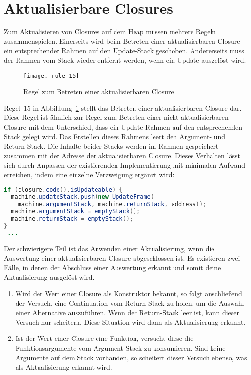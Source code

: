 \section{Aktualisierbare Closures}\label{sec:updateable-closures}

Zum Aktualisieren von Closures auf dem Heap müssen mehrere Regeln zusammenspielen.
Einerseits wird beim Betreten einer aktualisierbaren Closure ein entsprechender Rahmen auf den Update-Stack geschoben.
Andererseits muss der Rahmen vom Stack wieder entfernt werden, wenn ein Update ausgelöst wird.

\begin{figure}[h]
  \centering
  \texttt{[image: rule-15]}
  \caption{Regel zum Betreten einer aktualisierbaren Closure}\label{fig:rule-15}
\end{figure}

Regel~15 in Abbildung~\ref{fig:rule-15} stellt das Betreten einer aktualisierbaren Closure dar.
Diese Regel ist ähnlich zur Regel zum Betreten einer nicht-aktualisierbaren Closure mit dem Unterschied, dass ein Update-Rahmen auf den entsprechenden Stack gelegt wird.
Das Erstellen dieses Rahmens leert den Argument- und Return-Stack.
Die Inhalte beider Stacks werden im Rahmen gespeichert zusammen mit der Adresse der aktualisierbaren Closure.
Dieses Verhalten lässt sich durch Anpassen der existierenden Implementierung mit minimalen Aufwand erreichen, indem eine einzelne Verzweigung ergänzt wird:

\begin{lstlisting}[language=java]
if (closure.code().isUpdateable) {
  machine.updateStack.push(new UpdateFrame(
    machine.argumentStack, machine.returnStack, address));
  machine.argumentStack = emptyStack();
  machine.returnStack = emptyStack();
}
 ...
\end{lstlisting}

Der schwierigere Teil ist das Anwenden einer Aktualisierung, wenn die Auswertung einer aktualisierbaren Closure abgeschlossen ist.
Es existieren zwei Fälle, in denen der Abschluss einer Auswertung erkannt und somit deine Aktualisierung ausgelöst wird.

\begin{enumerate}
\item
  Wird der Wert einer Closure als Konstruktor bekannt, so folgt anschließend der Versuch, eine Continuation vom Return-Stack zu holen, um die Auswahl einer Alternative auszuführen.
  Wenn der Return-Stack leer ist, kann dieser Versuch nur scheitern.
  Diese Situation wird dann als Aktualisierung erkannt.
\item
  Ist der Wert einer Closure eine Funktion, versucht diese die Funktionsargumente vom Argument-Stack zu konsumieren.
  Sind keine Argumente auf dem Stack vorhanden, so scheitert dieser Versuch ebenso, was als Aktualisierung erkannt wird.
\end{enumerate}

